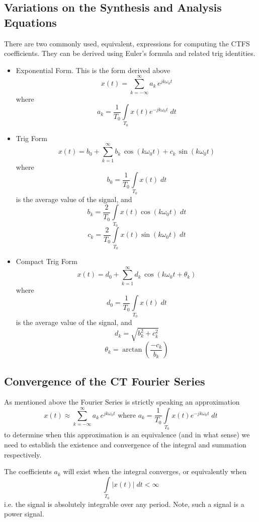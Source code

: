 \subsection{Variations on the Synthesis and Analysis Equations}
There are two commonly used, equivalent, expressions for computing the CTFS coefficients. They can be derived using Euler's formula and related trig identities.

\begin{itemize}
\item Exponential Form. This is the form derived above
  \[
  x(t) = \sum\limits_{k = -\infty}^{\infty} a_k \, e^{j k\omega_0 t}
  \]
  where 
  \[
  a_k = \frac{1}{T_0} \int\limits_{T_0} x(t)e^{-jk\omega_0 t} \; dt
  \]
\item Trig Form
  \[
  x(t) = b_0 + \sum\limits_{k = 1}^{\infty} b_k \,\cos(k\omega_0 t) + c_k\,\sin(k\omega_0 t) 
  \]
  where
  \[
  b_0 = \frac{1}{T_0} \int\limits_{T_0} x(t) \; dt
  \]
  is the average value of the signal, and
  \[
  b_k = \frac{2}{T_0} \int\limits_{T_0} x(t)\cos(k\omega_0 t) \; dt
  \]
  \[
  c_k = \frac{2}{T_0} \int\limits_{T_0} x(t)\sin(k\omega_0 t) \; dt
  \]
\item Compact Trig Form
  \[
  x(t) = d_0 + \sum\limits_{k = 1}^{\infty} d_k \,\cos(k\omega_0 t + \theta_k) 
  \]
  where
  \[
  d_0 = \frac{1}{T_0} \int\limits_{T_0} x(t) \; dt
  \]
  is the average value of the signal, and
  \[
  d_k = \sqrt{b_k^2 + c_k^2} 
  \]
  \[
  \theta_k = \arctan\left( \frac{-c_k}{b_k} \right)
  \]
\end{itemize}

\subsection{Convergence of the CT Fourier Series}

As mentioned above the Fourier Series is strictly speaking an approximation
\[
x(t) \approx \sum\limits_{k = -\infty}^{\infty} a_k \, e^{j k\omega_0 t} \mbox{ where } a_k = \frac{1}{T_0} \int\limits_{T_0} x(t)e^{-jk\omega_0 t} \; dt
\]
to determine when this approximation is an equivalence (and in what sense) we need to establish the existence and convergence of the integral and summation respectively.

The coefficients $a_k$ will exist when the integral converges, or equivalently when
\[
\int\limits_{T_0} \left|x(t)\right| \; dt < \infty
\]
i.e. the signal is absolutely integrable over any period. Note, such a signal is a power signal.

